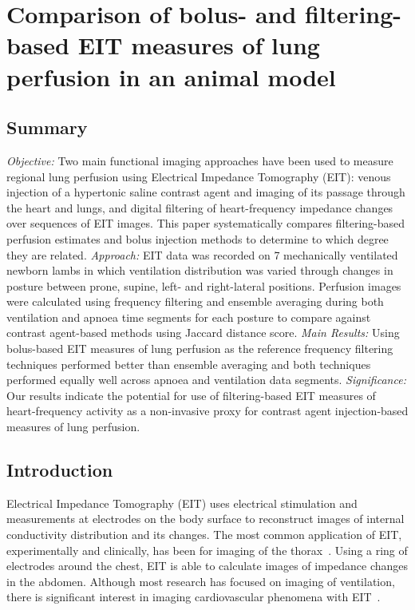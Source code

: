 \chapter{Comparison of bolus- and filtering-based EIT measures of lung perfusion in an animal model}

\section{Summary}
    \emph{Objective:} Two main functional imaging approaches have been used to measure regional lung perfusion 
    using Electrical Impedance Tomography (EIT): venous injection of a hypertonic saline contrast
    agent and imaging of its passage through the heart and lungs, and digital filtering 
    of heart-frequency impedance changes over sequences of EIT images.
    This paper systematically compares filtering-based perfusion estimates and 
    bolus injection methods to determine to which degree they are related.
    \emph{Approach:} EIT data was recorded on 7 mechanically ventilated newborn lambs in which 
    ventilation distribution was varied through changes in posture
    between prone, supine, left- and right-lateral positions.
    Perfusion images were calculated using frequency filtering and ensemble averaging 
    during both ventilation and apnoea time segments for each posture to compare against 
    contrast agent-based methods using Jaccard distance score. 
    \emph{Main Results:} Using bolus-based EIT measures of lung perfusion as the reference
    frequency filtering techniques performed better than ensemble averaging
    and both techniques performed equally well across apnoea and ventilation data segments.
    \emph{Significance:} Our results indicate the potential for use of
    filtering-based EIT measures of heart-frequency activity as a non-invasive
    proxy for contrast agent injection-based measures of lung perfusion. 

\section{Introduction}

Electrical Impedance Tomography (EIT) uses electrical stimulation and measurements at electrodes on the
body surface to reconstruct images of internal conductivity
distribution and its changes.
The most common application of EIT, experimentally and clinically,
has been for imaging of the thorax~\parencite{Frerichs2017}.
Using a ring of electrodes around the chest, EIT is able to calculate
images of impedance changes in the abdomen.
Although most research has focused on
imaging of ventilation, there is significant interest in imaging
cardiovascular phenomena with EIT~\parencite{Adler2012,Leonhardt2012}. 

